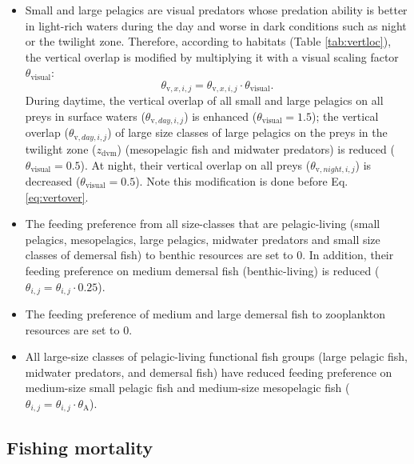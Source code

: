 \documentclass[
]{article}
\begin{document}
\begin{itemize}
\item
  Small and large pelagics are visual predators whose predation ability
  is better in light-rich waters during the day and worse in dark
  conditions such as night or the twilight zone. Therefore, according to
  habitats (Table \ref{tab:vertloc}), the vertical overlap is modified
  by multiplying it with a visual scaling factor
  \(\theta_{\mathrm{visual}}\): \begin{equation}
  \theta_{\mathrm{v},x,i,j} = \theta_{\mathrm{v},x,i,j} \cdot \theta_{\mathrm{visual}} .
  \end{equation} During daytime, the vertical overlap of all small and
  large pelagics on all preys in surface waters
  (\(\theta_{\mathrm{v},day,i,j}\)) is enhanced
  (\(\theta_{\mathrm{visual}}=1.5\)); the vertical overlap
  (\(\theta_{\mathrm{v},day,i,j}\)) of large size classes of large
  pelagics on the preys in the twilight zone (\(z_{\mathrm{dvm}}\))
  (mesopelagic fish and midwater predators) is reduced
  (\(\theta_{\mathrm{visual}}=0.5\)). At night, their vertical overlap
  on all preys (\(\theta_{\mathrm{v},night,i,j}\)) is decreased
  (\(\theta_{\mathrm{visual}}=0.5\)). Note this modification is done
  before Eq. \ref{eq:vertover}.
\item
  The feeding preference from all size-classes that are pelagic-living
  (small pelagics, mesopelagics, large pelagics, midwater predators and
  small size classes of demersal fish) to benthic resources are set to
  0. In addition, their feeding preference on medium demersal fish
  (benthic-living) is reduced
  (\(\theta_{i,j}=\theta_{i,j} \cdot 0.25\)).
\item
  The feeding preference of medium and large demersal fish to
  zooplankton resources are set to 0.
\item
  All large-size classes of pelagic-living functional fish groups (large
  pelagic fish, midwater predators, and demersal fish) have reduced
  feeding preference on medium-size small pelagic fish and medium-size
  mesopelagic fish
  (\(\theta_{i,j}=\theta_{i,j} \cdot \theta_{\mathrm{A}}\)).
\end{itemize}

\subsection{Fishing mortality}\label{fishing-mortality}
\end{document}
